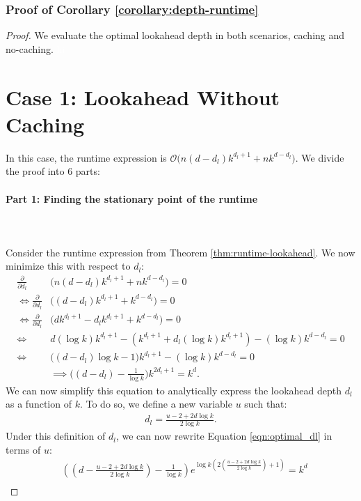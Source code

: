 \subsubsection{Proof of Corollary \ref{corollary:depth-runtime}}
\optimaldepth*
\begin{proof}
We evaluate the optimal lookahead depth in both scenarios, caching and no-caching.
\textcolor{white}{hi}
\section*{Case 1: Lookahead Without Caching}
In this case, the runtime expression is $\mathcal{O}\Big(n(d-d_l)k^{d_l+1} + nk^{d - d_l}\Big)$. We divide the proof into $6$ parts: 
\paragraph{Part 1: Finding the stationary point of the runtime}\leavevmode\leavevmode\\\\
Consider the runtime expression from Theorem \ref{thm:runtime-lookahead}. We now minimize this  with respect to $d_l$: 
\begin{align}
    \frac{\partial}{\partial d_l} &\Big(n(d-d_l)k^{d_l+1} + nk^{d - d_l}\Big) = 0 \\
    \iff \frac{\partial}{\partial d_l} &\Big((d-d_l)k^{d_l+1} + k^{d - d_l}\Big) = 0 \\
    \iff \frac{\partial}{\partial d_l} &\Big(dk^{d_l+1} - d_l k^{d_l+1} + k^{d - d_l}\Big) = 0 \\
    \iff&d (\log k) k^{d_l + 1} - (k^{d_l + 1} + d_l (\log k) k^{d_l + 1}) - (\log k) k^{d-d_l} = 0 \\ 
    \iff&\big((d-d_l)\log k - 1\big) k^{d_l+1} - (\log k) k^{d-d_l} = 0 \\ 
    \label{eqn:optimal_dl} &\implies \Big( (d-d_l) - \frac{1}{\log k}\Big)k^{2d_l + 1} = k^d.  
\end{align}
We can now simplify this equation to analytically express the lookahead depth $d_l$ as a function of $k$. To do so, we define a new variable $u$ such that:
\begin{align}
\label{eqn:d_l_u}
    d_l = \frac{u - 2+2d\log k}{2\log k}.
\end{align}
Under this definition of $d_l$, we can now rewrite Equation \ref{eqn:optimal_dl} in terms of $u$:
\begin{align}
    &\left(\left(d-\frac{u - 2+2d\log k}{2\log k}\right) - \frac{1}{\log k}\right)e^{\log k{\left(2\left(\frac{u - 2+2d\log k}{2\log k}\right) + 1\right)}} = k^d \\

\end{align}
\end{proof}
